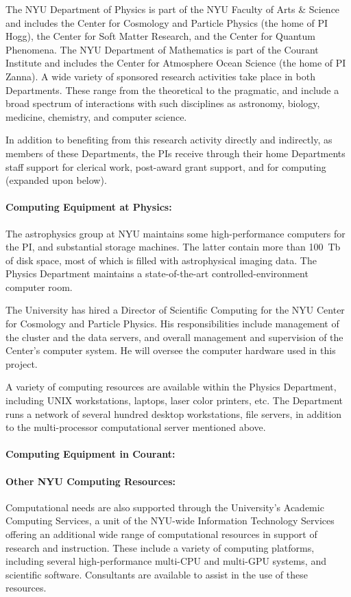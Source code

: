 The NYU Department of Physics is part of the NYU Faculty of Arts \& Science and includes the Center for Cosmology and Particle Physics (the home of PI Hogg), the Center for Soft Matter Research, and the Center for Quantum Phenomena.
The NYU Department of Mathematics is part of the Courant Institute and includes the Center for Atmosphere Ocean Science (the home of PI Zanna).
A wide variety of sponsored
research activities take place in both Departments.
These range from
the theoretical to the pragmatic, and include a broad spectrum of
interactions with such disciplines as astronomy, biology, medicine, chemistry, and computer science.

In addition to benefiting from this research activity directly and indirectly, as members of these Departments, the PIs receive through their home Departments staff support for clerical work, post-award grant support, and for computing (expanded upon below).

\paragraph{Computing Equipment at Physics:}
The astrophysics group at NYU maintains some high-performance computers
for the PI, and substantial storage machines.
The latter contain more than 100~Tb of disk space, most of which is filled
with astrophysical imaging data.  The Physics Department maintains a
state-of-the-art controlled-environment computer room.

The University has hired a Director of Scientific Computing for the
NYU Center for Cosmology and Particle Physics.  His
responsibilities include management of the cluster and the data
servers, and overall management and supervision of the Center's
computer system.  He will oversee the computer hardware used in this
project.

A variety of computing resources are available within the Physics
Department, including UNIX workstations, laptops, laser color
printers, etc.  The Department runs a network of several hundred
desktop workstations, file servers, in addition to the multi-processor
computational server mentioned above.

\paragraph{Computing Equipment in Courant:}

\paragraph{Other NYU Computing Resources:}
Computational needs are also supported through the University's
Academic Computing Services, a unit of the NYU-wide Information
Technology Services offering an additional wide range of computational
resources in support of research and instruction.  These include a
variety of computing platforms, including several high-performance
multi-CPU and multi-GPU systems, and scientific software.  Consultants are available
to assist in the use of these resources.

